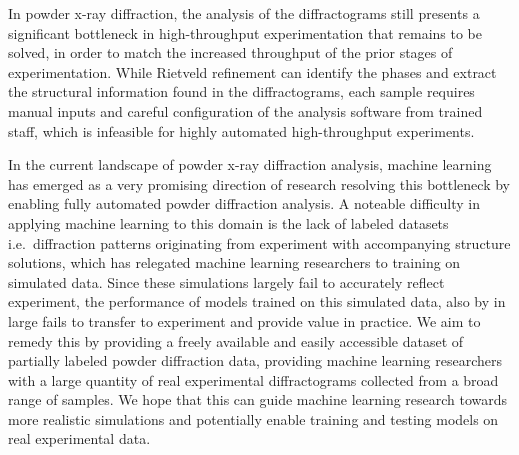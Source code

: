 In powder x-ray diffraction, the analysis of the diffractograms still presents a significant bottleneck
in high-throughput experimentation that remains to be solved, in order to match the increased throughput
of the prior stages of experimentation.
While Rietveld refinement can identify the phases and extract the structural information found
in the diffractograms, each sample requires manual inputs and careful configuration of the analysis software
from trained staff, which is infeasible for highly automated high-throughput experiments.

In the current landscape of powder x-ray diffraction analysis, machine learning has emerged as a very promising direction of research resolving this bottleneck by enabling fully automated powder diffraction analysis.
A noteable difficulty in applying machine learning to this domain is the lack of labeled datasets i.e.\
diffraction patterns originating from experiment with accompanying structure solutions, which has relegated machine learning
researchers to training on simulated data.
Since these simulations largely fail to accurately reflect experiment, the performance of models trained
on this simulated data, also by in large fails to transfer to experiment and provide value in practice.
We aim to remedy this by providing a freely available and easily accessible dataset of partially labeled
powder diffraction data, providing machine learning researchers with a large quantity of real experimental diffractograms
collected from a broad range of samples.
We hope that this can guide machine learning research towards more realistic
simulations and potentially enable training and testing models on real experimental data.



